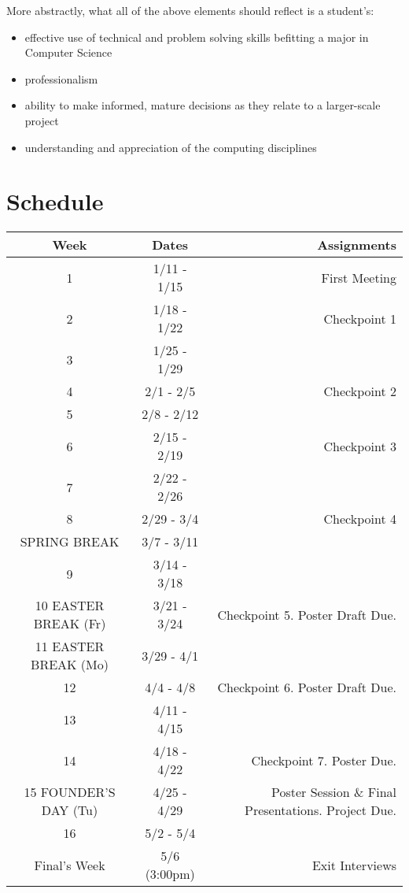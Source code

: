 \documentclass[10pt]{article}
\begin{document}
More abstractly, what all of the above elements should reflect is a student's: 
\begin{itemize}
\item effective use of technical and problem solving skills befitting a major in Computer Science
\item professionalism
\item ability to make informed, mature decisions as they relate to a larger-scale project
\item understanding and appreciation of the computing disciplines
\end{itemize}

\section{Schedule}


\begin{center}
\begin{tabular}{|c|c|r|}
\hline 
Week & Dates & Assignments \\
\hline
1 & 1/11 - 1/15 &  First Meeting\\
\hline
2 & 1/18 - 1/22 & Checkpoint 1 \\
\hline
3 & 1/25 - 1/29 &   \\
\hline
4 & 2/1 - 2/5 & Checkpoint 2  \\
\hline
5 & 2/8 - 2/12 &  \\
\hline
6 & 2/15 - 2/19 & Checkpoint 3 \\
\hline
7 & 2/22 - 2/26 &   \\
\hline
8 & 2/29 - 3/4 & Checkpoint 4  \\
\hline 
SPRING BREAK & 3/7 - 3/11 &  \\
\hline
9 & 3/14 - 3/18 &  \\
\hline
10 EASTER BREAK (Fr)& 3/21 - 3/24 & Checkpoint 5. Poster Draft Due.\\
\hline
11 EASTER BREAK (Mo)& 3/29 - 4/1 &  \\
\hline
12 & 4/4 - 4/8 & Checkpoint 6. Poster Draft Due.\\
\hline
13 & 4/11 - 4/15 &   \\
\hline
14 & 4/18 - 4/22 &  Checkpoint 7. Poster Due. \\
\hline
15 FOUNDER'S DAY (Tu) & 4/25 - 4/29 & Poster Session \& Final Presentations. Project Due.\\ 
\hline
16 & 5/2 - 5/4 & \\
\hline
Final's Week & 5/6 (3:00pm) & Exit Interviews \\ 
\hline
\end{tabular}
\end{center}
\end{document}
